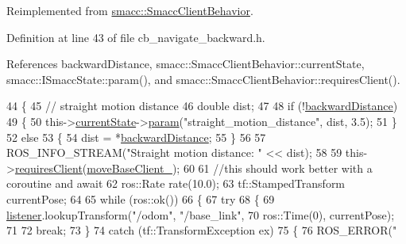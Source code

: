 Reimplemented from \hyperlink{classsmacc_1_1SmaccClientBehavior_a7962382f93987c720ad432fef55b123f}{smacc\+::\+Smacc\+Client\+Behavior}.



Definition at line 43 of file cb\+\_\+navigate\+\_\+backward.\+h.



References backward\+Distance, smacc\+::\+Smacc\+Client\+Behavior\+::current\+State, smacc\+::\+I\+Smacc\+State\+::param(), and smacc\+::\+Smacc\+Client\+Behavior\+::requires\+Client().


\begin{DoxyCode}
44     \{
45         \textcolor{comment}{// straight motion distance}
46         \textcolor{keywordtype}{double} dist;
47 
48         \textcolor{keywordflow}{if} (!\hyperlink{classsm__dance__bot_1_1move__base__z__client_1_1CbNavigateBackwards_a4067b6379c6f1c8e7d6d90a1206e98f8}{backwardDistance})
49         \{
50             this->\hyperlink{classsmacc_1_1SmaccClientBehavior_af76fc9b877542ed5caf033f820c107d0}{currentState}->\hyperlink{classsmacc_1_1ISmaccState_a4982f2187ed6da337462721146e8ef70}{param}(\textcolor{stringliteral}{"straight\_motion\_distance"}, dist, 3.5);
51         \}
52         \textcolor{keywordflow}{else}
53         \{
54             dist = *\hyperlink{classsm__dance__bot_1_1move__base__z__client_1_1CbNavigateBackwards_a4067b6379c6f1c8e7d6d90a1206e98f8}{backwardDistance};
55         \}
56 
57         ROS\_INFO\_STREAM(\textcolor{stringliteral}{"Straight motion distance: "} << dist);
58 
59         this->\hyperlink{classsmacc_1_1SmaccClientBehavior_a917f001e763a1059af337bf4e164f542}{requiresClient}(\hyperlink{classsm__dance__bot_1_1move__base__z__client_1_1CbNavigateBackwards_a566448c392e347b21c51126572421603}{moveBaseClient\_});
60 
61         \textcolor{comment}{//this should work better with a coroutine and await}
62         ros::Rate rate(10.0);
63         tf::StampedTransform currentPose;
64 
65         \textcolor{keywordflow}{while} (ros::ok())
66         \{
67             \textcolor{keywordflow}{try}
68             \{
69                 \hyperlink{classsm__dance__bot_1_1move__base__z__client_1_1CbNavigateBackwards_aeaaa632b142737c65bc87587aa02a3bf}{listener}.lookupTransform(\textcolor{stringliteral}{"/odom"}, \textcolor{stringliteral}{"/base\_link"},
70                                          ros::Time(0), currentPose);
71 
72                 \textcolor{keywordflow}{break};
73             \}
74             \textcolor{keywordflow}{catch} (tf::TransformException ex)
75             \{
76                 ROS\_ERROR(\textcolor{stringliteral}{"%
}
\end{DoxyCode}
